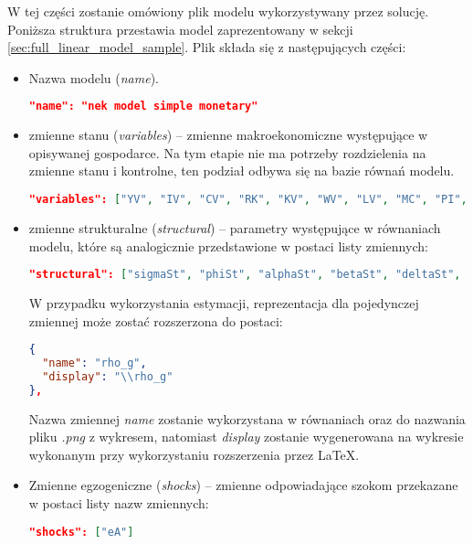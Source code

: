 W tej części zostanie omówiony plik modelu wykorzystywany przez solucję. Poniższa struktura przestawia model zaprezentowany w sekcji \ref{sec:full_linear_model_sample}. Plik składa się z następujących części:
\begin{itemize}
    \item Nazwa modelu (\emph{name}).
    \begin{lstlisting}[language=json,firstnumber=1]
 "name": "nek model simple monetary"
    \end{lstlisting}
    
    \item zmienne stanu (\emph{variables}) -- zmienne makroekonomiczne występujące w opisywanej gospodarce. Na tym etapie nie ma potrzeby rozdzielenia na zmienne stanu i kontrolne, ten podział odbywa się na bazie równań modelu.
    \begin{lstlisting}[language=json,firstnumber=2]
 "variables": ["YV", "IV", "CV", "RK", "KV", "WV", "LV", "MC", "PI", "AV", "RQ"]
    \end{lstlisting}
    \item zmienne strukturalne (\emph{structural}) -- parametry występujące w równaniach modelu, które są analogicznie przedstawione w postaci listy zmiennych:
    \begin{lstlisting}[language=json,firstnumber=3]
 "structural": ["sigmaSt", "phiSt", "alphaSt", "betaSt", "deltaSt", "rhoASt", "psiSt", "thetaSt", "phiPSt", "rhoQSt"]
    \end{lstlisting}
    W przypadku wykorzystania estymacji, reprezentacja dla pojedynczej zmiennej może zostać rozszerzona do postaci:
    \begin{lstlisting}[language=json,firstnumber=2]
{
  "name": "rho_g",
  "display": "\\rho_g"
},
    \end{lstlisting}
    Nazwa zmiennej \emph{name} zostanie wykorzystana w równaniach oraz do nazwania pliku \emph{.png} z wykresem, natomiast \emph{display} zostanie wygenerowana na wykresie wykonanym przy wykorzystaniu rozszerzenia  przez \LaTeX.
    \item Zmienne egzogeniczne (\emph{shocks}) -- zmienne odpowiadające szokom przekazane w postaci listy nazw zmiennych:
    \begin{lstlisting}[language=json,firstnumber=4]
 "shocks": ["eA"]
    \end{lstlisting}
    

\end{itemize}
